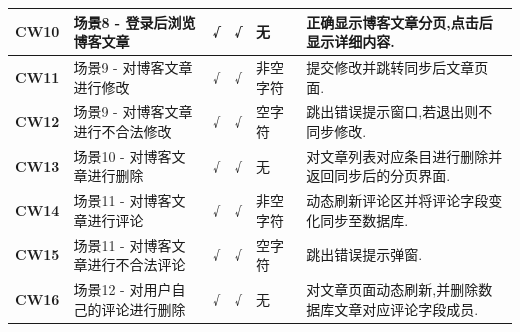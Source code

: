 \begin{table}[thbp!]
{\begin{tabular}{|l|l|c|c|l|l|}
		
		
		\textbf{CW10}     & 场景8 - 登录后浏览博客文章    & √                                & √                                & 无              & 正确显示博客文章分页,点击后显示详细内容.       \\ \hline
		\textbf{CW11}     & 场景9 - 对博客文章进行修改    & √                                & √                                & 非空字符           & 提交修改并跳转同步后文章页面.             \\ \hline
		\textbf{CW12}     & 场景9 - 对博客文章进行不合法修改 & √                                & √                                & 空字符            & 跳出错误提示窗口,若退出则不同步修改.         \\ \hline
		\textbf{CW13}     & 场景10 - 对博客文章进行删除    & √                                & √                                & 无              & 对文章列表对应条目进行删除并返回同步后的分页界面.   \\ \hline
		\textbf{CW14}     & 场景11 - 对博客文章进行评论    & √                                & √                                & 非空字符           & 动态刷新评论区并将评论字段变化同步至数据库.      \\ \hline
		\textbf{CW15}     & 场景11 - 对博客文章进行不合法评论 & √                                & √                                & 空字符            & 跳出错误提示弹窗.                   \\ \hline
		\textbf{CW16}     & 场景12 - 对用户自己的评论进行删除 & √                                & √                                & 无              & 对文章页面动态刷新,并删除数据库文章对应评论字段成员. \\ \hline
		
	\end{tabular}

}
	
\end{table}



















